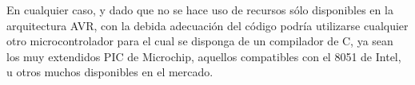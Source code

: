 En cualquier caso, y dado que no se hace uso de recursos sólo disponibles en la arquitectura AVR, con la debida adecuación del código podría utilizarse cualquier otro microcontrolador para el cual se disponga de un compilador de C, ya sean los muy extendidos PIC\cite{pic} de Microchip, aquellos compatibles con el 8051\cite{8051} de Intel, u otros muchos disponibles en el mercado.


